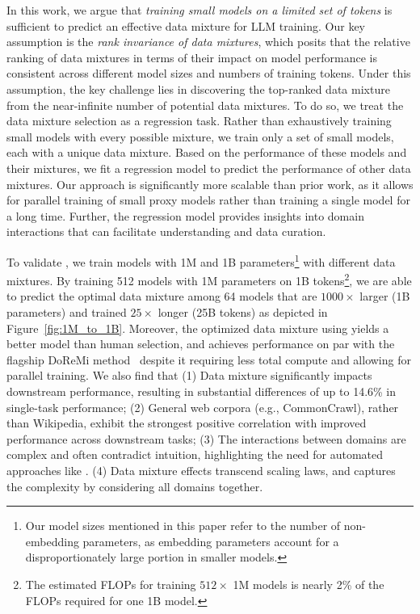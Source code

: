 In this work, we argue that \textit{training small models on a limited set of tokens} is sufficient to predict an effective data mixture for LLM training. Our key assumption is the \textit{rank invariance of data mixtures}, which posits that the relative ranking of data mixtures in terms of their impact on model performance is consistent across different model sizes and numbers of training tokens. Under this assumption, the key challenge lies in discovering the top-ranked data mixture from the near-infinite number of potential data mixtures. To do so, we treat the data mixture selection as a regression task. Rather than exhaustively training small models with every possible mixture, we train only a set of small models, each with a unique data mixture. Based on the performance of these models and their mixtures, we fit a regression model to predict the performance of other data mixtures. Our approach is significantly more scalable than prior work, as it allows for parallel training of small proxy models rather than training a single model for a long time. Further, the regression model provides insights into domain interactions that can facilitate understanding and data curation.  

To validate \ourmethod, we train models with 1M and 1B parameters\footnote{Our model sizes mentioned in this paper refer to the number of non-embedding parameters, as embedding parameters account for a disproportionately large portion in smaller models.} with different data mixtures. By training 512 models with 1M parameters on 1B tokens\footnote{The estimated FLOPs for training $512 \times$ 1M models is nearly 2\% of the FLOPs required for one 1B model.}, we are able to predict the optimal data mixture among 64 models that are $1000 \times$ larger (1B parameters) and trained $25 \times$ longer (25B tokens) as depicted in Figure~\ref{fig:1M_to_1B}.
Moreover, the optimized data mixture using \ourmethod yields a better model than human selection, and achieves performance on par with the flagship DoReMi method~\citep{xie2023doremi} despite it requiring less total compute and allowing for parallel training.
We also find that (1) Data mixture significantly impacts downstream performance, resulting in substantial differences of up to 14.6\% in single-task performance; (2) General web corpora (e.g., CommonCrawl), rather than Wikipedia, exhibit the strongest positive correlation with improved performance across downstream tasks;
(3) The interactions between domains are complex and often contradict intuition, highlighting the need for automated approaches like \ourmethod. (4) Data mixture effects transcend scaling laws, and \ourmethod captures the complexity by considering all domains together. 
